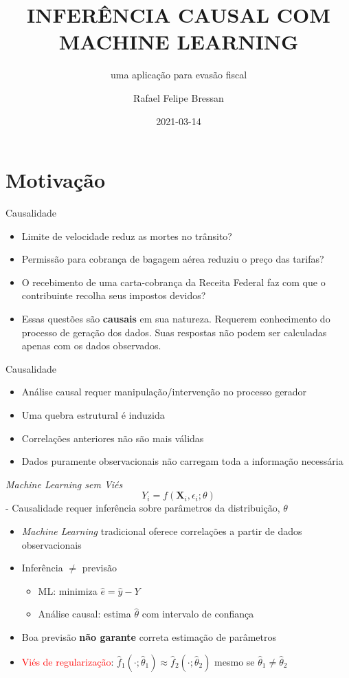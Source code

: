 \documentclass[
  12pt,
  ignorenonframetext,
  aspectratio=169]{beamer}
\title{INFERÊNCIA CAUSAL COM MACHINE LEARNING}
\subtitle{uma aplicação para evasão fiscal}
\author{Rafael Felipe Bressan}
\date{2021-03-14}
\institute{Receita Federal do Brasil}
\providecommand{\tightlist}{%
  \setlength{\itemsep}{0pt}\setlength{\parskip}{0pt}}
\begin{document}
\frame{\titlepage}

\hypertarget{motivacao}{%
\section{Motivação}\label{motivacao}}

\begin{frame}{Causalidade}
\protect\hypertarget{causalidade}{}
\begin{itemize}
\item
  Limite de velocidade reduz as mortes no trânsito?
\item
  Permissão para cobrança de bagagem aérea reduziu o preço das tarifas?
\item
  O recebimento de uma carta-cobrança da Receita Federal faz com que o
  contribuinte recolha seus impostos devidos?
\item
  Essas questões são \textbf{causais} em sua natureza. Requerem
  conhecimento do processo de geração dos dados. Suas respostas não
  podem ser calculadas apenas com os dados observados.
\end{itemize}
\end{frame}

\begin{frame}{Causalidade}
\protect\hypertarget{causalidade-1}{}
\begin{itemize}
\item
  Análise causal requer manipulação/intervenção no processo gerador
\item
  Uma quebra estrutural é induzida
\item
  Correlações anteriores não são mais válidas
\item
  Dados puramente observacionais não carregam toda a informação
  necessária
\end{itemize}
\end{frame}

\begin{frame}{\emph{Machine Learning sem Viés}}
\protect\hypertarget{machine-learning-sem-viuxe9s}{}
\[Y_i=f(\mathbf{X}_i, \epsilon_i;\theta)\] - Causalidade requer
inferência sobre parâmetros da distribuição, \(\theta\)

\begin{itemize}
\item
  \emph{Machine Learning} tradicional oferece correlações a partir de
  dados observacionais
\item
  Inferência \(\neq\) previsão

  \begin{itemize}
  \tightlist
  \item
    ML: minimiza \(\hat e = \hat y - Y\)
  \item
    Análise causal: estima \(\hat\theta\) com intervalo de confiança
  \end{itemize}
\item
  Boa previsão \textbf{não garante} correta estimação de parâmetros
\item
  \textcolor{red}{Viés de regularização}:
  \(\hat f_1(\cdot;\hat\theta_1)\approx \hat f_2(\cdot;\hat\theta_2)\)
  mesmo se \(\hat\theta_1\neq\hat\theta_2\)
\end{itemize}
\end{frame}
\end{document}

